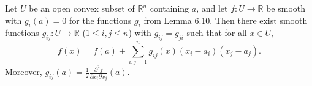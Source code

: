 Let $U$ be an open convex subset of $\mathbb{R}^n$ containing $a$, and let $f: U \to \mathbb{R}$ be smooth with $g_i(a) = 0$ for the functions $g_i$ from Lemma 6.10. Then there exist smooth functions $g_{ij}: U \to \mathbb{R}$ ($1 \leq i, j \leq n$) with $g_{ij} = g_{ji}$ such that for all $x \in U$,
$$f(x) = f(a) + \sum_{i,j=1}^{n} g_{ij}(x)(x_i - a_i)(x_j - a_j).$$
Moreover, $g_{ij}(a) = \frac{1}{2} \frac{\partial^2 f}{\partial x_i \partial x_j}(a)$.

